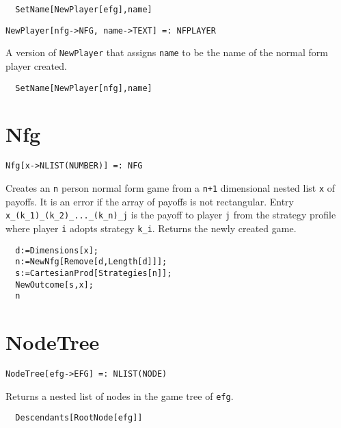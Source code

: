\udfbody
\begin{verbatim}
  SetName[NewPlayer[efg],name]
\end{verbatim} 

\newsignature

\begin{verbatim}
NewPlayer[nfg->NFG, name->TEXT] =: NFPLAYER 
\end{verbatim}

\noindent
A version of \verb+NewPlayer+ that assigns \verb+name+ to be the name
of the normal form player created.  

\udfbody
\begin{verbatim}
  SetName[NewPlayer[nfg],name]
\end{verbatim} 


\section*{Nfg}\label{ExtNfg}
\begin{verbatim}
Nfg[x->NLIST(NUMBER)] =: NFG 
\end{verbatim}

\noindent
Creates an \verb+n+ person normal form game from a \verb&n+1&
dimensional nested list \verb+x+ of payoffs.  It is an error if the
array of payoffs is not rectangular.  Entry
\verb+x_(k_1)_(k_2)_..._(k_n)_j+ is the payoff to player \verb+j+ from
the strategy profile where player \verb+i+ adopts strategy \verb+k_i+.
Returns the newly created game.

\udfbody
\begin{verbatim}
  d:=Dimensions[x];
  n:=NewNfg[Remove[d,Length[d]]];
  s:=CartesianProd[Strategies[n]];
  NewOutcome[s,x];
  n
\end{verbatim} 


\section*{NodeTree}\label{ExtNodeTree}
\begin{verbatim}
NodeTree[efg->EFG] =: NLIST(NODE) 
\end{verbatim}

\noindent
Returns a nested list of nodes in the game tree of \verb+efg+.  

\udfbody
\begin{verbatim}
  Descendants[RootNode[efg]]
\end{verbatim} 

